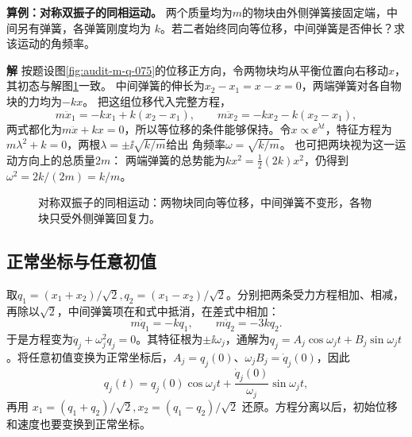 \documentclass[11pt,openany,fontset=fandol]{ctexbook}
\theoremstyle{plain}\newtheorem{theorem}{定理}[chapter]\newtheorem{proposition}[theorem]{命题}
\theoremstyle{definition}\newtheorem{definition}{定义}[chapter]\newtheorem{example}{例}[chapter]
\theoremstyle{remark}\newtheorem*{remark}{说明}
\newcommand{\SolutionStart}{\par\nobreak\medskip\nobreak\noindent\textbf{解}\quad\ignorespaces}
\newenvironment{solution}{\SolutionStart}{\par\medskip}
\begin{document}
\textbf{算例：对称双振子的同相运动。} 两个质量均为$m$的物块由外侧弹簧接固定端，中间另有弹簧，各弹簧刚度均为 $k$。若二者始终同向等位移，中间弹簧是否伸长？求该运动的角频率。

\begin{solution}
按题设图\ref{fig:audit-m-q-075}的位移正方向，令两物块均从平衡位置向右移动$x$，其初态与解图\ref{fig:warm-3}一致。
中间弹簧的伸长为$x_2-x_1=x-x=0$，两端弹簧对各自物块的力均为$-kx$。
把这组位移代入完整方程，
\[
 m\ddot x_1=-kx_1+k(x_2-x_1),\qquad
 m\ddot x_2=-kx_2-k(x_2-x_1),
\]
两式都化为$m\ddot x+kx=0$，所以等位移的条件能够保持。令$x\propto\ee^{\lambda t}$，特征方程为$m\lambda^2+k=0$，两根$\lambda=\pm\ii\sqrt{k/m}$给出
角频率$\omega=\sqrt{k/m}$。
也可把两块视为这一运动方向上的总质量$2m$：
两端弹簧的总势能为$kx^2=\tfrac12(2k)x^2$，仍得到$\omega^2=2k/(2m)=k/m$。

\begin{figure}[H]\centering
{}
\caption{对称双振子的同相运动：两物块同向等位移，中间弹簧不变形，各物块只受外侧弹簧回复力。}\label{fig:warm-3}
\end{figure}
\end{solution}

\subsection{正常坐标与任意初值}
取$q_1=(x_1+x_2)/\sqrt2,q_2=(x_1-x_2)/\sqrt2$。分别把两条受力方程相加、相减，再除以$\sqrt2$，中间弹簧项在和式中抵消，在差式中相加：
\[
m\ddot q_1=-kq_1,\qquad m\ddot q_2=-3kq_2.
\]
于是方程变为$\ddot q_j+\omega_j^2q_j=0$。其特征根为$\pm\ii\omega_j$，通解为$q_j=A_j\cos\omega_jt+B_j\sin\omega_jt$。将任意初值变换为正常坐标后，$A_j=q_j(0)$、$\omega_jB_j=\dot q_j(0)$，因此
\begin{equation}
q_j(t)=q_j(0)\cos\omega_jt+\frac{\dot q_j(0)}{\omega_j}\sin\omega_jt,
\end{equation}
再用 $x_1=(q_1+q_2)/\sqrt2,x_2=(q_1-q_2)/\sqrt2$ 还原。方程分离以后，初始位移和速度也要变换到正常坐标。
\end{document}
